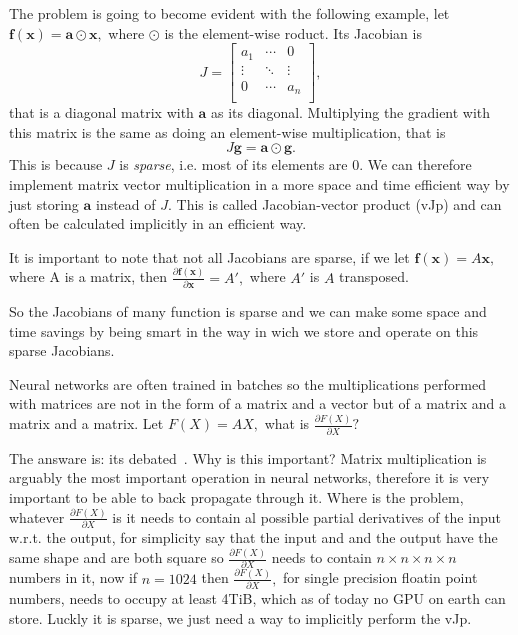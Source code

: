 \documentclass{article}
\newcommand{\partialfrac}[2]{\frac{\partial #1}{\partial #2}}
\newcommand{\hadam}{\odot} %
\renewcommand\vec[1]{\mathbf{#1}}
\begin{document}
The problem is going to become evident with the following example, let \(\vec
f(\vec x) = \vec a \hadam \vec x,\) where \(\hadam\) is the element-wise
roduct. Its Jacobian is \[
J = \left[\begin{array}{ccc}
a_1 & \cdots & 0 \\
\vdots & \ddots & \vdots \\
0 & \cdots & a_n \\
\end{array}\right]\!,
\] that is a diagonal matrix with \(\vec a\) as its diagonal. Multiplying the
gradient with this matrix is the same as doing an element-wise multiplication,
that is \[
J \vec g = \vec a \hadam \vec g.
\] This is because \(J\) is \emph{sparse}, i.e. most of its elements are 0.
We can therefore implement matrix vector multiplication in a more space and
time efficient way by just storing \(\vec a\) instead of \(J.\) This is called
Jacobian-vector product (vJp) and can often be calculated implicitly in an
efficient way.

It is important to note that not all Jacobians are sparse, if we let \(\vec
f(\vec x) = A \vec x,\) where A is a matrix, then
\(\partialfrac{\vec f(\vec x)}{\vec x} = A',\) where \(A'\) is \(A\)
transposed.

So the Jacobians of many function is sparse and we can make some space and time
savings by being smart in the way in wich we store and operate on this sparse
Jacobians.

Neural networks are often trained in batches so the multiplications performed
with matrices are not in the form of a matrix and a vector but of a matrix and
a matrix and a matrix. Let \(F(X) = AX,\) what is \(\partialfrac{F(X)}{X}?\)

The answare is: its debated~\cite{notion}. Why is this important? Matrix multiplication is
arguably the most important operation in neural networks, therefore it is very
important to be able to back propagate through it. Where is the problem,
whatever \(\partialfrac{F(X)}{X}\) is it needs to contain al possible partial
derivatives of the input w.r.t. the output, for simplicity say that the input
and and the output have the same shape and are both square so
\(\partialfrac{F(X)}{X}\) needs to contain \(n \times n \times n \times n\)
numbers in it, now if \(n=1024\) then \(\partialfrac{F(X)}{X},\) for single
precision floatin point numbers, needs to occupy at least 4TiB, which as of
today no GPU on earth can store. Luckly it is sparse, we just need a way to
implicitly perform the vJp.
\end{document}

